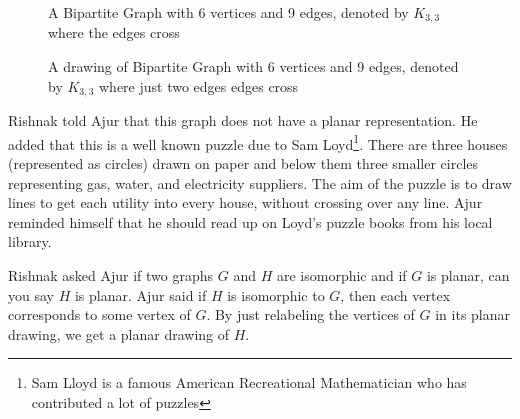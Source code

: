 \begin{figure}
\begin{center}
\caption{ A Bipartite Graph with 6 vertices and 9 edges, denoted by $K_{3,3}$ where the edges cross}\label{9g5}
\end{center}
\end{figure}
\begin{figure}
\begin{center}
\caption{ A  drawing of Bipartite Graph with 6 vertices and 9 edges, denoted by $K_{3,3}$ where just two edges edges cross}\label{9g6}
\end{center}
\end{figure}
Rishnak told Ajur that this graph does not have a planar representation. He added that this is a well known puzzle due to Sam Loyd\footnote{Sam Lloyd is a famous American Recreational Mathematician who has contributed a lot of puzzles}. There are three houses (represented as circles) drawn on paper and below them three smaller circles representing gas, water, and electricity suppliers. The aim of the puzzle is to draw lines to get each utility into every house, without crossing over any line. Ajur reminded himself that he should read up on Loyd's puzzle books from his local library.

 Rishnak asked Ajur if two graphs $G$ and $H$ are isomorphic and if $G$ is planar, can you say $H$ is planar. Ajur said if $H$ is isomorphic to $G$, then each vertex corresponds to some vertex of $G$. By just relabeling the vertices of $G$ in its planar drawing, we get a planar drawing of $H$.
 
